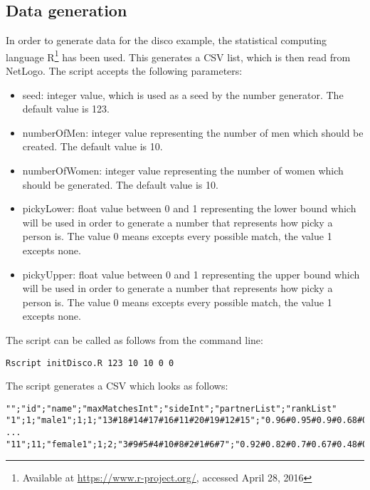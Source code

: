 \subsection{Data generation}
In order to generate data for the disco example, the statistical computing language R\footnote{Available at \url{https://www.r-project.org/}, accessed April 28, 2016} has been used. 
This generates a CSV list, which is then read from NetLogo. 
The script accepts the following parameters:
\begin{itemize}
	\item seed: integer value, which is used as a seed by the number generator. The default value is 123.
	\item numberOfMen: integer value representing the number of men which should be created. The default value is 10.
	\item numberOfWomen: integer value representing the number of women which should be generated. The default value is 10.
	\item pickyLower: float value between 0 and 1 representing the lower bound which will be used in order to generate a number that represents how picky a person is. The value 0 means excepts every possible match, the value 1 excepts none.
	\item pickyUpper: float value between 0 and 1 representing the upper bound which will be used in order to generate a number that represents how picky a person is. The value 0 means excepts every possible match, the value 1 excepts none.
\end{itemize}

The script can be called as follows from the command line: 
\begin{verbatim}
Rscript initDisco.R 123 10 10 0 0
\end{verbatim}

The script generates a CSV which looks as follows:
\begin{verbatim}
"";"id";"name";"maxMatchesInt";"sideInt";"partnerList";"rankList"
"1";1;"male1";1;1;"13#18#14#17#16#11#20#19#12#15";"0.96#0.95#0.9#0.68#0.57#0.45#0.33#0.25#0.1#0.04"
...
"11";11;"female1";1;2;"3#9#5#4#10#8#2#1#6#7";"0.92#0.82#0.7#0.67#0.48#0.41#0.35#0.25#0.22#0.05"
\end{verbatim}


